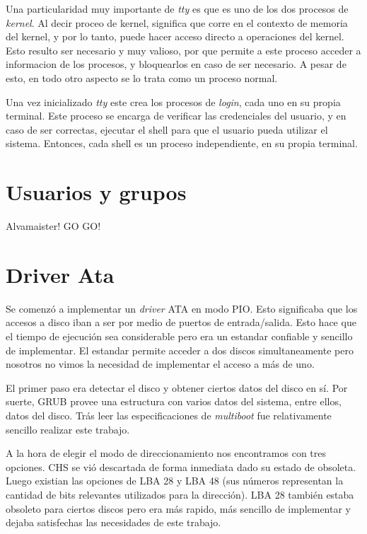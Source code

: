 \documentclass[a4paper,10pt]{article}
\begin{document}
Una particularidad muy importante de \textit{tty} es que es uno de los dos procesos de \textit{kernel}.
Al decir proceo de kernel, significa que corre en el contexto de memoria del kernel, y por lo tanto, puede hacer acceso directo a operaciones del kernel.
Esto resulto ser necesario y muy valioso, por que permite a este proceso acceder a informacion de los procesos, y bloquearlos en caso de ser necesario.
A pesar de esto, en todo otro aspecto se lo trata como un proceso normal.

Una vez inicializado \textit{tty} este crea los procesos de \textit{login}, cada uno en su propia terminal.
Este proceso se encarga de verificar las credenciales del usuario, y en caso de ser correctas, ejecutar el shell para que el usuario pueda utilizar el sistema.
Entonces, cada shell es un proceso independiente, en su propia terminal.

\newpage
\section{Usuarios y grupos}
Alvamaister! GO GO!

\newpage
\section{Driver Ata}
    Se comenzó a implementar un \textit{driver} ATA en modo PIO. Esto significaba que los accesos a disco iban a ser
    por medio de puertos de entrada/salida. Esto hace que el tiempo de ejecución sea considerable pero era un estandar
    confiable y sencillo de implementar.
    El estandar permite acceder a dos discos simultaneamente pero nosotros no vimos la necesidad de implementar el 
    acceso a más de uno.
    
    El primer paso era detectar el disco y obtener ciertos datos del disco en sí. Por suerte, GRUB provee una estructura
    con varios datos del sistema, entre ellos, datos del disco. Trás leer las especificaciones de \textit{multiboot}
    fue relativamente sencillo realizar este trabajo.

    A la hora de elegir el modo de direccionamiento nos encontramos con tres opciones. CHS se vió descartada de forma
    inmediata dado su estado de obsoleta. Luego existian las opciones de LBA 28 y LBA 48 (sus números representan
    la cantidad de bits relevantes utilizados para la dirección). LBA 28 también estaba obsoleto para ciertos discos
    pero era más rapido, más sencillo de implementar y dejaba satisfechas las necesidades de este trabajo.
\end{document}
